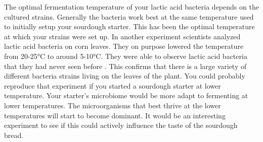 The optimal fermentation temperature of your
lactic acid bacteria depends on the cultured strains. Generally the bacteria
work best at the same temperature used to initially setup your sourdough
starter. This has been the optimal temperature at which your strains
were set up. In another experiment scientists analyzed lactic acid bacteria
on corn leaves. They on purpose lowered the temperature from 20-25°C to around 5-10°C.
They were able to observe lactic acid bacteria that they had never seen
before \cite{temperature+bacteria+corn}. This confirms that there is a
large variety of different bacteria
strains living on the leaves of the plant. You could probably reproduce
that experiment if you started a sourdough starter at lower temperature.
Your starter's microbiome would be more adapt to fermenting at lower
temperatures. The microorganisms that best thrive at the lower temperatures
will start to become dominant. It would be an interesting experiment
to see if this could actively influence the taste of the sourdough
bread.
